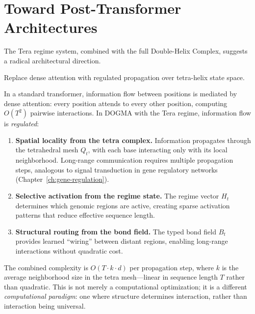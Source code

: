 \section{Toward Post-Transformer Architectures}
\label{sec:post-transformer}

The Tera regime system, combined with the full Double-Helix Complex, suggests a radical architectural direction.

\begin{keyinsight}
Replace dense attention with regulated propagation over tetra-helix state space.
\end{keyinsight}

In a standard transformer, information flow between positions is mediated by dense attention: every position attends to every other position, computing $O(T^2)$ pairwise interactions. In DOGMA with the Tera regime, information flow is \emph{regulated}:

\begin{enumerate}[leftmargin=1.8em]
  \item \textbf{Spatial locality from the tetra complex.} Information propagates through the tetrahedral mesh $Q_t$, with each base interacting only with its local neighborhood. Long-range communication requires multiple propagation steps, analogous to signal transduction in gene regulatory networks (Chapter~\ref{ch:gene-regulation}).

  \item \textbf{Selective activation from the regime state.} The regime vector $H_t$ determines which genomic regions are active, creating sparse activation patterns that reduce effective sequence length.

  \item \textbf{Structural routing from the bond field.} The typed bond field $B_t$ provides learned ``wiring'' between distant regions, enabling long-range interactions without quadratic cost.
\end{enumerate}

The combined complexity is $O(T \cdot k \cdot d)$ per propagation step, where $k$ is the average neighborhood size in the tetra mesh---linear in sequence length $T$ rather than quadratic. This is not merely a computational optimization; it is a different \emph{computational paradigm}: one where structure determines interaction, rather than interaction being universal.

